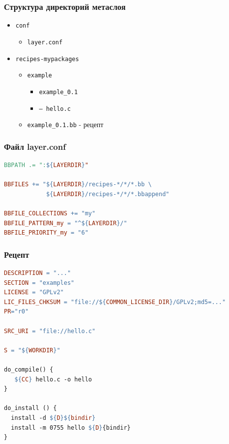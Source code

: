 \begin{frame}
  \frametitle{Структура директорий метаслоя}
  \begin{itemize}
    \item \texttt{conf}
      \begin{itemize}
          \item \texttt{layer.conf}
      \end{itemize}
    \item \texttt{recipes-mypackages}
      \begin{itemize}
        \item \texttt{example}
          \begin{itemize}
            \item \texttt{example\_0.1}
                \item \texttt{--- hello.c}
          \end{itemize}
          \item \texttt{example\_0.1.bb}  - рецепт
      \end{itemize}
  \end{itemize}
\end{frame}

\begin{frame}[fragile]
  \frametitle{Файл layer.conf}
\begin{lstlisting}[language=make]
BBPATH .= ":${LAYERDIR}"

BBFILES += "${LAYERDIR}/recipes-*/*/*.bb \
            ${LAYERDIR}/recipes-*/*/*.bbappend"

BBFILE_COLLECTIONS += "my"
BBFILE_PATTERN_my = "^${LAYERDIR}/"
BBFILE_PRIORITY_my = "6"
\end{lstlisting}
\end{frame}

\begin{frame}[fragile]
  \frametitle{Рецепт}
\begin{lstlisting}[language=make]
DESCRIPTION = "..."
SECTION = "examples"
LICENSE = "GPLv2"
LIC_FILES_CHKSUM = "file://${COMMON_LICENSE_DIR}/GPLv2;md5=..."
PR="r0"

SRC_URI = "file://hello.c"

S = "${WORKDIR}"

do_compile() {
   ${CC} hello.c -o hello
}

do_install () {
  install -d ${D}${bindir}
  install -m 0755 hello ${D}{bindir}
}
\end{lstlisting}
\end{frame}

\begin{frame}[fragile]
  \frametitle{}
\end{frame}

